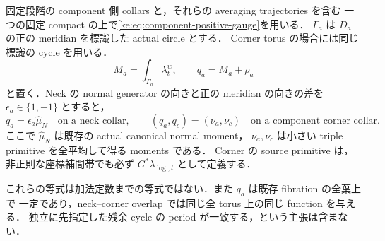 \begin{lemma}
\label{ke:component-meridian-normalization}
固定段階の component 側 collars と，それらの averaging trajectories を含む
一つの固定 compact の上で\eqref{ke:eq:component-positive-gauge}を用いる．
$\Gamma_a$ は $D_a$ の正の meridian を標識した actual circle とする．
Corner torus の場合には同じ標識の cycle を用いる．
\[
 M_a=\int_{\Gamma_a}\lambda_t^w,\qquad q_a=M_a+\rho_a
\]
と置く．Neck の normal generator の向きと正の meridian の向きの差を
$\epsilon_a\in\{1,-1\}$ とすると，
\begin{equation}\label{ke:eq:component-exact-action-normalization}
 q_a=\epsilon_a\widehat\mu_N
 \quad\text{on a neck collar},\qquad
 (q_a,q_c)=(\nu_a,\nu_c)
 \quad\text{on a component corner collar}.
\end{equation}
ここで $\widehat\mu_N$ は既存の actual canonical normal moment，
$\nu_a,\nu_c$ は小さい triple primitive を全平均して得る moments である．
Corner の source primitive は，非正則な座標補間帯でも必ず
$G^*\lambda_{\log,t}$ として定義する．

これらの等式は加法定数までの等式ではない．また $q_a$ は既存 fibration の全葉上で
一定であり，neck--corner overlap では同じ全 torus 上の同じ function を与える．
独立に先指定した残余 cycle の period が一致する，という主張は含まない．
\end{lemma}

